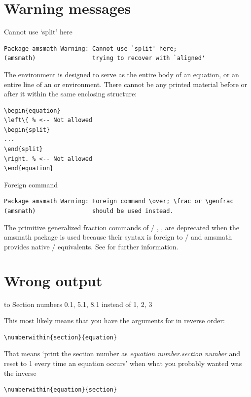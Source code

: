 \documentclass[leqno,titlepage,openany]{amsldoc}[1999/12/13]
\makeatletter
\newcommand{\nipkg}{\textsf}
\newenvironment{erroro}[1]{%
  \par\addvspace\medskipamount
  \noindent\hangindent\parindent
  \hbox to\parindent{\errorbullet\hfil}\ignorespaces
  #1\par\vspace{\smallskipamount}
}{%
  \par\addvspace\medskipamount
}
\let\oldcs\cs
\def\cs#1{\texorpdfstring{\oldcs{#1}}{\@backslashchar\@backslashchar#1}}
\let\cn\cs
\makeatother
\begin{document}

\section{Warning messages}

\begin{error}{Cannot use `split' here}
\errexa
\begin{verbatim}
Package amsmath Warning: Cannot use `split' here;
(amsmath)                trying to recover with `aligned'
\end{verbatim}
\errexpl The  environment is designed to serve as the entire
body of an equation, or an entire line of an  or 
environment. There cannot be any printed material before or
after it within the same enclosing structure:
\begin{verbatim}
\begin{equation}
\left\{ % <-- Not allowed
\begin{split}
...
\end{split}
\right. % <-- Not allowed
\end{equation}
\end{verbatim}
\end{error}

\begin{error}{Foreign command }
\errexa
\begin{verbatim}
Package amsmath Warning: Foreign command \over; \frac or \genfrac
(amsmath)                should be used instead.
\end{verbatim}
\errexpl The primitive generalized fraction commands of \tex/\mdash
{}, , \mdash are deprecated when the
\nipkg{amsmath} package is used because their syntax is foreign to \latex/
and \nipkg{amsmath} provides native \latex/ equivalents. See
 for further information.
\end{error}


\section{Wrong output}

\begin{erroro}{Section numbers 0.1, 5.1, 8.1 instead of 1, 2, 3}
%
This most likely means that you have the arguments for \cn{numberwithin}
in reverse order:
\begin{verbatim}
\numberwithin{section}{equation}
\end{verbatim}
That means `print the section number as \textit{equation
number}.\textit{section number} and reset to 1 every time an equation
occurs' when what you probably wanted was the inverse
\begin{verbatim}
\numberwithin{equation}{section}
\end{verbatim}
\end{erroro}
\end{document}
